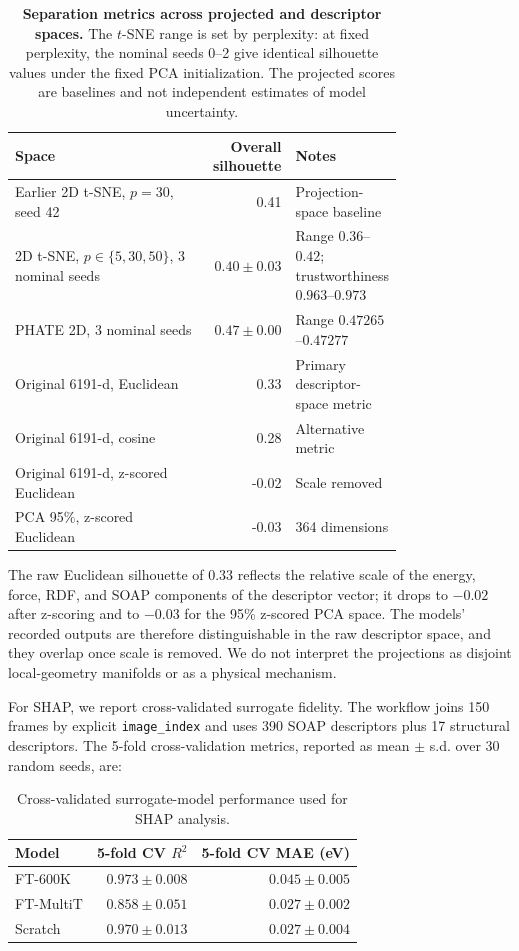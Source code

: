 \documentclass[11pt,a4paper]{article}
\begin{document}
\begin{table}[h]
\centering
\scriptsize
\setlength{\tabcolsep}{2pt}
\caption{\textbf{Separation metrics across projected and descriptor spaces.} The $t$-SNE range is set by perplexity: at fixed perplexity, the nominal seeds 0--2 give identical silhouette values under the fixed PCA initialization. The projected scores are baselines and not independent estimates of model uncertainty.}
\begin{tabular}{p{0.50\linewidth}rp{0.27\linewidth}}
\toprule
Space & Overall silhouette & Notes \\
\midrule
Earlier 2D t-SNE, $p=30$, seed 42 & 0.41 & Projection-space baseline \\
2D t-SNE, $p \in \{5,30,50\}$, 3 nominal seeds & $0.40 \pm 0.03$ & Range $0.36$--$0.42$; trustworthiness $0.963$--$0.973$ \\
PHATE 2D, 3 nominal seeds & $0.47 \pm 0.00$ & Range $0.47265$--$0.47277$ \\
Original 6191-d, Euclidean & 0.33 & Primary descriptor-space metric \\
Original 6191-d, cosine & 0.28 & Alternative metric \\
Original 6191-d, z-scored Euclidean & -0.02 & Scale removed \\
PCA 95\%, z-scored Euclidean & -0.03 & 364 dimensions \\
\bottomrule
\end{tabular}
\end{table}

The raw Euclidean silhouette of 0.33 reflects the relative scale of the energy, force, RDF, and SOAP components of the descriptor vector; it drops to $-0.02$ after z-scoring and to $-0.03$ for the 95\% z-scored PCA space. The models' recorded outputs are therefore distinguishable in the raw descriptor space, and they overlap once scale is removed. We do not interpret the projections as disjoint local-geometry manifolds or as a physical mechanism.

For SHAP, we report cross-validated surrogate fidelity. The workflow joins 150 frames by explicit \texttt{image\_index} and uses 390 SOAP descriptors plus 17 structural descriptors. The 5-fold cross-validation metrics, reported as mean $\pm$ s.d. over 30 random seeds, are:

\begin{table}[h]
\centering
\caption{Cross-validated surrogate-model performance used for SHAP analysis.}
\begin{tabular}{lrr}
\toprule
Model & 5-fold CV $R^2$ & 5-fold CV MAE (eV) \\
\midrule
FT-600K & $0.973 \pm 0.008$ & $0.045 \pm 0.005$ \\
FT-MultiT & $0.858 \pm 0.051$ & $0.027 \pm 0.002$ \\
Scratch & $0.970 \pm 0.013$ & $0.027 \pm 0.004$ \\
\bottomrule
\end{tabular}
\end{table}
\end{document}
